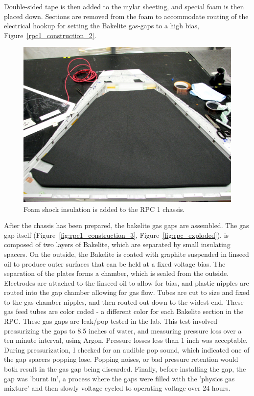 Double-sided tape is then added to the mylar sheeting, and special foam is then
placed down. Sections are removed from the foam to accommodate routing of the
electrical hookup for setting the Bakelite gas-gaps to a high bias,
Figure~\ref{rpc1_construction_2}.

\begin{figure}
  \centering
  \includegraphics[width=0.7\linewidth]{./figures/rpc1_construction_2}
  \caption{
    Foam shock insulation is added to the RPC 1 chassis.
  }
  \label{fig:rpc1_construction_2}
\end{figure}

After the chassis has been prepared, the bakelite gas gaps are assembled. The
gas gap itself (Figure~\ref{fig:rpc1_construction_3},
Figure~\ref{fig:rpc_exploded}), is composed of two layers of Bakelite, which are
separated by small insulating spacers. On the outside, the Bakelite is coated
with graphite suspended in linseed oil to produce outer surfaces that can be
held at a fixed voltage bias.  The separation of the plates forms a chamber,
which is sealed from the outside.  Electrodes are attached to the linseed oil to
allow for bias, and plastic nipples are routed into the gap chamber allowing for
gas flow. Tubes are cut to size and fixed to the gas chamber nipples, and then
routed out down to the widest end. These gas feed tubes are color coded - a
different color for each Bakelite section in the RPC. These gas gaps are
leak/pop tested in the lab.  This test involved pressurizing the gaps to 8.5
inches of water, and measuring pressure loss over a ten minute interval, using
Argon. Pressure losses less than 1 inch was acceptable. During pressurization, I
checked for an audible pop sound, which indicated one of the gap spacers popping
lose. Popping noises, or bad pressure retention would both result in the gas gap
being discarded.  Finally, before installing the gap, the gap was 'burnt in', a
process where the gaps were filled with the 'physics gas mixture' and then
slowly voltage cycled to operating voltage over 24 hours.

